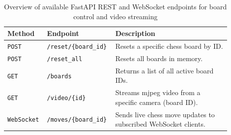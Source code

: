 \begin{table}[h!]
    \centering
    \caption[API endpoint overview]{Overview of available FastAPI REST and WebSocket endpoints for board control and video streaming}
    \label{tab:api-endpoints}
    \begin{tabular}{L{0.15\linewidth}L{0.25\linewidth}L{0.5\linewidth}}
        \toprule
        \textbf{Method} & \textbf{Endpoint} & \textbf{Description} \\
        \midrule
        \texttt{POST} & \texttt{/reset/\{board\_id\}} & Resets a specific chess board by ID. \\
        \texttt{POST} & \texttt{/reset\_all} & Resets all boards in memory. \\
        \texttt{GET} & \texttt{/boards} & Returns a list of all active board IDs. \\
        \texttt{GET} & \texttt{/video/\{id\}} & Streams \gls{mjpeg} video from a specific camera (board ID). \\
        \texttt{WebSocket} & \texttt{/moves/\{board\_id\}} & Sends live chess move updates to subscribed WebSocket clients. \\
        \bottomrule
    \end{tabular}
\end{table}

% 

% 

% 

% 

